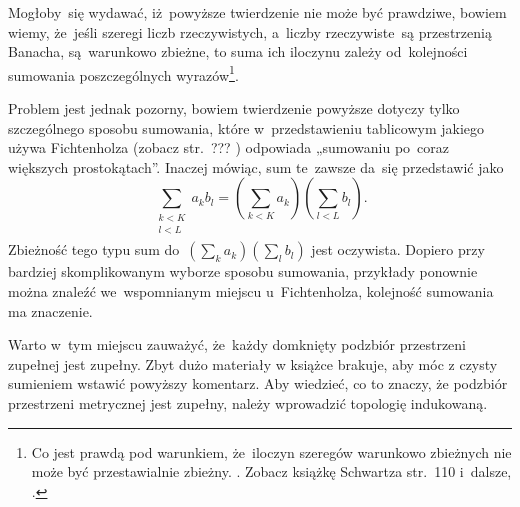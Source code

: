 \documentclass[a4paper,11pt]{article}
\begin{document}
Mogłoby~się wydawać, iż~powyższe twierdzenie nie może być prawdziwe,
bowiem wiemy, że~jeśli szeregi liczb rzeczywistych, a~liczby
rzeczywiste~są przestrzenią Banacha, są~warunkowo zbieżne, to suma ich
iloczynu zależy od~kolejności sumowania poszczególnych
wyrazów\footnote{Co jest prawdą pod warunkiem, że~iloczyn szeregów
  warunkowo zbieżnych nie może być przestawialnie zbieżny. \Dok.
  Zobacz książkę Schwartza str.~110 i~dalsze,
  \cite{SchwartzKursAnalizyMatematycznejVolI1979}.}.

Problem jest jednak pozorny, bowiem twierdzenie powyższe dotyczy tylko
szczególnego sposobu sumowania, które w~przedstawieniu tablicowym
jakiego używa Fichtenholza (zobacz str.~??? \cite{FichtenholzRachunekRozniczkowyVolII2004})
odpowiada „sumowaniu po~coraz większych prostokątach”. Inaczej
mówiąc, sum te~zawsze da~się przedstawić jako
\begin{equation}
  \label{RS-Vol-I-s02-06}
  \sum_{ \substack{ k < K \\ l < L \\ } } a_{ k } b_{ l }
  = ( \sum_{ k < K } a_{ k } ) ( \sum_{ l < L } b_{ l } ).
\end{equation}
Zbieżność tego typu sum
do~$( \sum_{ k } a_{ k } ) ( \sum_{ l } b_{ l } )$ jest oczywista.
Dopiero przy bardziej skomplikowanym wyborze sposobu sumowania,
przykłady ponownie można znaleźć we~wspomnianym miejscu
u~Fichtenholza, kolejność sumowania ma znaczenie. %

\vspace{\spaceTwo}







\start {} Warto w~tym miejscu zauważyć, że~każdy domknięty
podzbiór przestrzeni zupełnej jest zupełny. Zbyt dużo materiały w
książce brakuje, aby móc z czysty sumieniem wstawić powyższy
komentarz. Aby wiedzieć, co to znaczy, że podzbiór przestrzeni
metrycznej jest zupełny, należy wprowadzić topologię indukowaną.


\end{document}
